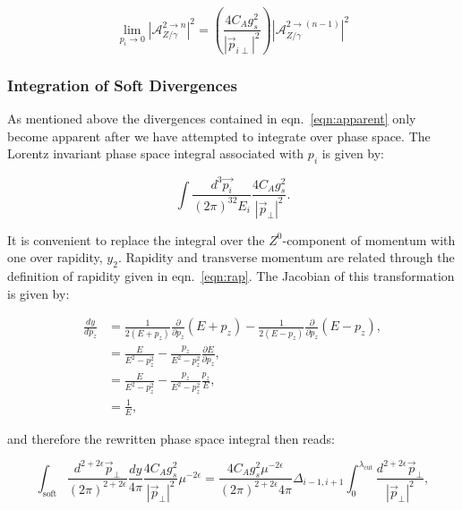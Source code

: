 			\begin{equation}
				\lim_{p_i\rightarrow0} |\mathcal{A}_{Z/\gamma}^{2\rightarrow n}|^2 = \left(\frac{4C_Ag_s^2}{|\vec{p}_{i\perp}|^2}\right)
					|\mathcal{A}_{Z/\gamma}^{2\rightarrow (n-1)}|^2
				\label{eqn:apparent}
			\end{equation}

		\subsubsection{Integration of Soft Divergences}
			\label{sub:subsection_name}

			As mentioned above the divergences contained in eqn.~\eqref{eqn:apparent} only become
			apparent after we have attempted to integrate over phase space.  The Lorentz
			invariant phase space integral associated with $p_i$ is given by:

			\begin{equation}
				\int\frac{d^3\vec{p_i}}{(2\pi)^32E_i}\frac{4C_Ag_s^2}{|\vec{p}_\perp|^2}.
			\end{equation}

			It is convenient to replace the integral over the $Z^0$-component of momentum with one over rapidity,
			$y_2$.  Rapidity and transverse momentum are related through the definition of rapidity given
			in eqn.~\eqref{eqn:rap}.  The Jacobian of this transformation is given by:

			\begin{align*}
				\frac{dy}{dp_z} &= \frac{1}{2(E+p_z)} \frac{\partial}{\partial p_z}(E+p_z) - \frac{1}{2(E-p_z)}\frac{\partial}{\partial p_z}(E-p_z),\\
				&= \frac{E}{E^2-p_z^2} - \frac{p_z}{E^2-p_z^2}\frac{\partial E}{\partial p_z},\\
				&= \frac{E}{E^2-p_z^2} - \frac{p_z}{E^2-p_z^2}\frac{p_z}{E},\\
				&= \frac{1}{E},
			\end{align*}

			and therefore the rewritten phase space integral then reads:

			\begin{equation}
				\int_{\text{soft}}\frac{d^{2+2\epsilon}\vec{p}_{\perp}}{(2\pi)^{2+2\epsilon}}\frac{dy}{4\pi}\frac{4C_Ag_s^2}
					{|\vec{p}_\perp|^2}\mu^{-2\epsilon} = \frac{4C_Ag_s^2\mu^{-2\epsilon}}{(2\pi)^{2+2\epsilon}4\pi}
					\Delta_{i-1, i+1}\int_0^{\lambda_{\text{cut}}}\frac{d^{2+2\epsilon}\vec{p}_{\perp}}{|\vec{p}_\perp|^2},
			\end{equation}


